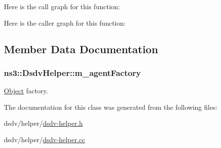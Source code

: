 Here is the call graph for this function\+:




Here is the caller graph for this function\+:




\subsection{Member Data Documentation}
\subsubsection[{\texorpdfstring{m\+\_\+agent\+Factory}{m_agentFactory}}]{ ns3\+::\+Dsdv\+Helper\+::m\+\_\+agent\+Factory\hspace{0.3cm}{\ttfamily [private]}}\hypertarget{classns3_1_1DsdvHelper_a03dd1fd69604f6c355fa51c6898cd0a1}{}\label{classns3_1_1DsdvHelper_a03dd1fd69604f6c355fa51c6898cd0a1}


\hyperlink{classns3_1_1Object}{Object} factory. 



The documentation for this class was generated from the following files\+:\begin{DoxyCompactItemize}
\item 
dsdv/helper/\hyperlink{dsdv-helper_8h}{dsdv-\/helper.\+h}\item 
dsdv/helper/\hyperlink{dsdv-helper_8cc}{dsdv-\/helper.\+cc}\end{DoxyCompactItemize}
